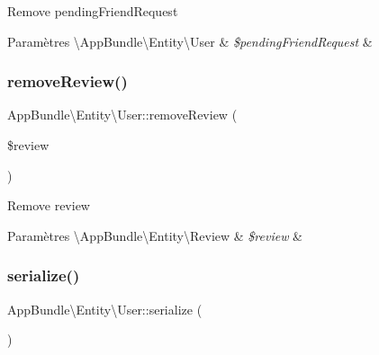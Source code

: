 Remove pending\+Friend\+Request


\begin{DoxyParams}[1]{Paramètres}
\textbackslash{}\+App\+Bundle\textbackslash{}\+Entity\textbackslash{}\+User & {\em \$pending\+Friend\+Request} & \\
\hline
\end{DoxyParams}
\mbox{\label{classAppBundle_1_1Entity_1_1User_aed23331dfb185937f4ba5330bd70f9b5}} 
\subsubsection{\texorpdfstring{remove\+Review()}{removeReview()}}
{\footnotesize\ttfamily App\+Bundle\textbackslash{}\+Entity\textbackslash{}\+User\+::remove\+Review (\begin{DoxyParamCaption}\item[{\textbackslash{}\hyperlink{classAppBundle_1_1Entity_1_1Review}{App\+Bundle\textbackslash{}\+Entity\textbackslash{}\+Review}}]{\$review }\end{DoxyParamCaption})}

Remove review


\begin{DoxyParams}[1]{Paramètres}
\textbackslash{}\+App\+Bundle\textbackslash{}\+Entity\textbackslash{}\+Review & {\em \$review} & \\
\hline
\end{DoxyParams}
\mbox{\label{classAppBundle_1_1Entity_1_1User_aea0ec322bcefd3f64da757770bb3a8a8}} 
\subsubsection{\texorpdfstring{serialize()}{serialize()}}
{\footnotesize\ttfamily App\+Bundle\textbackslash{}\+Entity\textbackslash{}\+User\+::serialize (\begin{DoxyParamCaption}{ }\end{DoxyParamCaption})}

